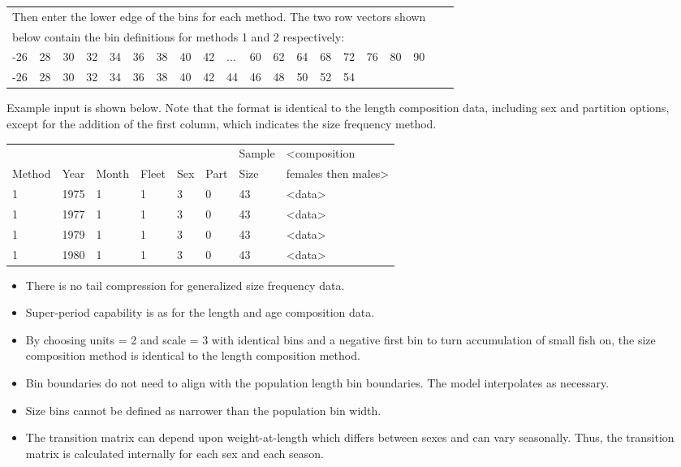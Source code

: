 \begin{center}
	\begin{tabular}{p{0.4cm} p{0.4cm} p{0.4cm} p{0.4cm} p{0.4cm} p{0.4cm} p{0.5cm} p{0.5cm} p{0.5cm} p{0.5cm} p{0.5cm} p{0.5cm} p{0.5cm} p{0.5cm} p{0.5cm} p{0.5cm} p{0.5cm} p{0.5cm} p{0.5cm} p{0.25cm}}
		\multicolumn{18}{l}{Then enter the lower edge of the bins for each method. The two row vectors shown}\\
		\multicolumn{18}{l}{below contain the bin definitions for methods 1 and 2 respectively:}\\
		\hline
		-26 & 28 & 30 & 32 & 34 & 36 & 38 & 40 & 42 & ... & 60 & 62 & 64 & 68 & 72 & 76 & 80 & 90\Tstrut\\
		-26 & 28 & 30 & 32 & 34 & 36 & 38 & 40 & 42 &  44 & 46 & 48 & 50 & 52 & \multicolumn{4}{l}{54} \
		\Bstrut\\
		\hline 
	\end{tabular}
\end{center}

Example input is shown below. Note that the format is identical to the length composition data, including sex and partition options, except for the addition of the first column, which indicates the size frequency method.

\begin{center}
	\begin{tabular}{p{1.5cm} p{1cm} p{1cm} p{1cm} p{1cm} p{1cm} p{1.5cm} p{5cm}}
		\hline
		& & & & & & Sample & <composition \Tstrut\\
		Method & Year & Month & Fleet & Sex & Part & Size & females then males>\Bstrut\\
		\hline
		1 & 1975 & 1 & 1 & 3 & 0 & 43 & <data> \Tstrut\\
		1 & 1977 & 1 & 1 & 3 & 0 & 43 & <data> \\
		1 & 1979 & 1 & 1 & 3 & 0 & 43 & <data> \\
		1 & 1980 & 1 & 1 & 3 & 0 & 43 & <data> \Bstrut\\
		\hline
	\end{tabular}
\end{center}

	\begin{itemize}
		\item There is no tail compression for generalized size frequency data.
		\item Super-period capability is as for the length and age composition data.
		\item By choosing units = 2 and scale = 3 with identical bins and a negative first bin to turn accumulation of small fish on, the size composition method is identical to the length composition method.
		\item Bin boundaries do not need to align with the population length bin boundaries. The model interpolates as necessary.
		\item Size bins cannot be defined as narrower than the population bin width.
		\item The transition matrix can depend upon weight-at-length which differs between sexes and can vary seasonally. Thus, the transition matrix is calculated internally for each sex and each season.
	\end{itemize}

